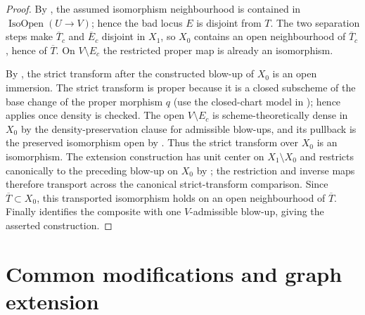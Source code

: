 \begin{proof}
  By , the assumed isomorphism
  neighbourhood is contained in $\operatorname{IsoOpen}(U\to V)$; hence the
  bad locus $E$ is disjoint from $T$.  The two separation steps make
  $\overline T_c$ and $\overline E_c$
  disjoint in $X_1$, so $X_0$ contains an open neighbourhood of
  $\overline T_c$, hence of $\overline T$.  On
  $V\setminus E_c$ the restricted proper map is already an isomorphism.

  By , the strict transform after
  the constructed blow-up of $X_0$ is an open immersion.  The strict transform
  is proper because it is a closed subscheme of the base change of the proper
  morphism $q$ (use the closed-chart model in
  ); hence
   applies once density is checked.
  The open $V\setminus E_c$ is scheme-theoretically dense in $X_0$ by the
  density-preservation clause for admissible blow-ups, and its pullback is the
  preserved isomorphism open by
  .  Thus the strict
  transform over $X_0$ is an isomorphism.  The extension construction has
  unit center on $X_1\setminus X_0$ and restricts canonically to the preceding
  blow-up on $X_0$ by
  ; the restriction and inverse
  maps therefore transport across the canonical strict-transform comparison.
  Since $\overline T\subset X_0$, this transported isomorphism holds on an
  open neighbourhood of $\overline T$.  Finally
   identifies the composite with one
  $V$-admissible blow-up, giving the asserted construction.
\end{proof}


\section{Common modifications and graph extension}

